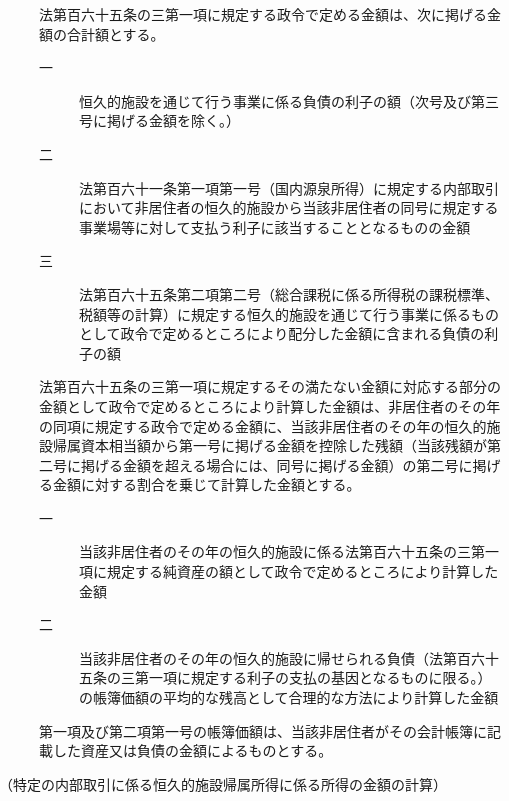 \documentclass[twocolumn,a4j,10pt]{ltjtarticle}
\begin{document}
\begin{description}
\item[]法第百六十五条の三第一項に規定する政令で定める金額は、次に掲げる金額の合計額とする。
\begin{description}
\item[一]恒久的施設を通じて行う事業に係る負債の利子の額（次号及び第三号に掲げる金額を除く。）
\item[二]法第百六十一条第一項第一号（国内源泉所得）に規定する内部取引において非居住者の恒久的施設から当該非居住者の同号に規定する事業場等に対して支払う利子に該当することとなるものの金額
\item[三]法第百六十五条第二項第二号（総合課税に係る所得税の課税標準、税額等の計算）に規定する恒久的施設を通じて行う事業に係るものとして政令で定めるところにより配分した金額に含まれる負債の利子の額
\end{description}
\item[]法第百六十五条の三第一項に規定するその満たない金額に対応する部分の金額として政令で定めるところにより計算した金額は、非居住者のその年の同項に規定する政令で定める金額に、当該非居住者のその年の恒久的施設帰属資本相当額から第一号に掲げる金額を控除した残額（当該残額が第二号に掲げる金額を超える場合には、同号に掲げる金額）の第二号に掲げる金額に対する割合を乗じて計算した金額とする。
\begin{description}
\item[一]当該非居住者のその年の恒久的施設に係る法第百六十五条の三第一項に規定する純資産の額として政令で定めるところにより計算した金額
\item[二]当該非居住者のその年の恒久的施設に帰せられる負債（法第百六十五条の三第一項に規定する利子の支払の基因となるものに限る。）の帳簿価額の平均的な残高として合理的な方法により計算した金額
\end{description}
\item[]第一項及び第二項第一号の帳簿価額は、当該非居住者がその会計帳簿に記載した資産又は負債の金額によるものとする。
\end{description}
\noindent\hspace{10pt}（特定の内部取引に係る恒久的施設帰属所得に係る所得の金額の計算）
\end{document}
